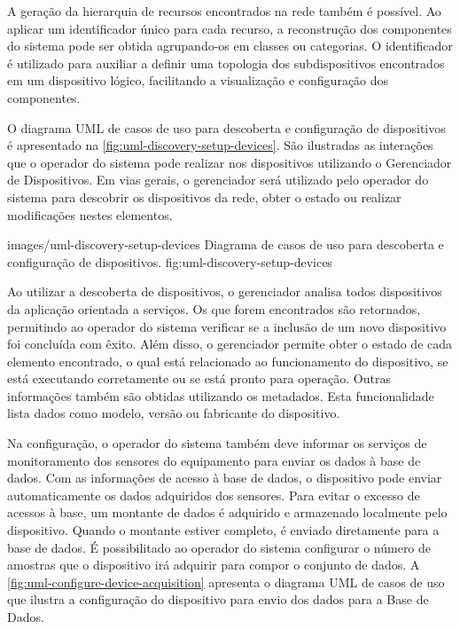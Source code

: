 A geração da hierarquia de recursos encontrados na rede também é possível. Ao aplicar um
identificador único para cada recurso, a reconstrução dos componentes do sistema pode ser obtida
agrupando-os em classes ou categorias. O identificador é utilizado para auxiliar a definir uma
topologia dos subdispositivos encontrados em um dispositivo lógico, facilitando a visualização e
configuração dos componentes.

O diagrama \gls{UML} de casos de uso para descoberta e configuração de dispositivos é apresentado na
\cref{fig:uml-discovery-setup-devices}. São ilustradas as interações que o operador do sistema pode
realizar nos dispositivos utilizando o Gerenciador de Dispositivos. Em vias gerais, o gerenciador
será utilizado pelo operador do sistema para descobrir os dispositivos da rede, obter o estado ou
realizar modificações nestes elementos.

  {images/uml-discovery-setup-devices}
  {Diagrama de casos de uso para descoberta e configuração de dispositivos.}
  {fig:uml-discovery-setup-devices}

Ao utilizar a descoberta de dispositivos, o gerenciador analisa todos dispositivos da aplicação
orientada a serviços. Os que forem encontrados são retornados, permitindo ao operador do sistema
verificar se a inclusão de um novo dispositivo foi concluída com êxito. Além disso, o gerenciador
permite obter o estado de cada elemento encontrado, o qual está relacionado ao funcionamento do
dispositivo, se está executando corretamente ou se está pronto para operação. Outras informações
também são obtidas utilizando os metadados. Esta funcionalidade lista dados como modelo, versão ou
fabricante do dispositivo.

Na configuração, o operador do sistema também deve informar os serviços de monitoramento dos
sensores do equipamento para enviar os dados à base de dados. Com as informações de acesso à base de
dados, o dispositivo pode enviar automaticamente os dados adquiridos dos sensores. Para evitar o
excesso de acessos à base, um montante de dados é adquirido e armazenado localmente pelo
dispositivo. Quando o montante estiver completo, é enviado diretamente para a base de dados. É
possibilitado ao operador do sistema configurar o número de amostras que o dispositivo irá adquirir
para compor o conjunto de dados. A \cref{fig:uml-configure-device-acquisition} apresenta o diagrama
\gls{UML} de casos de uso que ilustra a configuração do dispositivo para envio dos dados para a Base
de Dados.

